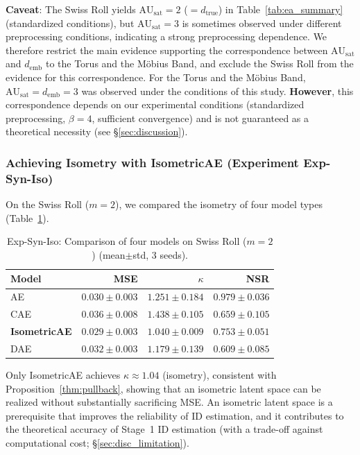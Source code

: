 \documentclass[make,article,submit,pdftex,moreauthors]{Definitions/mdpi}
\newcommand{\dtrue}{d_{\mathrm{true}}}
\newcommand{\kap}{\kappa}
\newcommand{\AUsat}{\mathrm{AU}_{\mathrm{sat}}}
\newcommand{\demb}{d_{\mathrm{emb}}}
\begin{document}
\textbf{Caveat}: The Swiss Roll yields $\AUsat=2$ ($= \dtrue$) in Table~\ref{tab:ea_summary} (standardized conditions),
but $\AUsat=3$ is sometimes observed under different preprocessing conditions,
indicating a strong preprocessing dependence.
We therefore restrict the main evidence supporting the correspondence between $\AUsat$ and $\demb$
to the Torus and the M\"obius Band, and exclude the Swiss Roll from the evidence for this correspondence.
For the Torus and the M\"obius Band, $\AUsat = \demb = 3$ was observed under the conditions of this study.
\textbf{However}, this correspondence depends on our experimental conditions
(standardized preprocessing, $\beta = 4$, sufficient convergence)
and is not guaranteed as a theoretical necessity (see \S\ref{sec:discussion}).

\subsubsection{Achieving Isometry with IsometricAE (Experiment Exp-Syn-Iso)}

On the Swiss Roll ($m = 2$), we compared the isometry of four model types (Table~\ref{tab:ec}).

\begin{table}[H]
\centering
\caption{Exp-Syn-Iso: Comparison of four models on Swiss Roll ($m=2$) (mean$\pm$std, 3 seeds).}
\label{tab:ec}
\small
\begin{tabular}{lrrr}
\toprule
Model & MSE & $\kap$ & NSR \\
\midrule
AE & $0.030\pm0.003$ & $1.251\pm0.184$ & $0.979\pm0.036$ \\
CAE & $0.036\pm0.008$ & $1.438\pm0.105$ & $0.659\pm0.105$ \\
\textbf{IsometricAE} & $\boldsymbol{0.029\pm0.003}$ & $\boldsymbol{1.040\pm0.009}$ & $0.753\pm0.051$ \\
DAE & $0.032\pm0.003$ & $1.179\pm0.139$ & $0.609\pm0.085$ \\
\bottomrule
\end{tabular}
\end{table}

Only IsometricAE achieves $\kap \approx 1.04$ (isometry), consistent with Proposition~\ref{thm:pullback},
showing that an isometric latent space can be realized without substantially sacrificing MSE.
An isometric latent space is a prerequisite that improves the reliability of ID estimation,
and it contributes to the theoretical accuracy of Stage~1 ID estimation
(with a trade-off against computational cost; \S\ref{sec:disc_limitation}).
\end{document}

